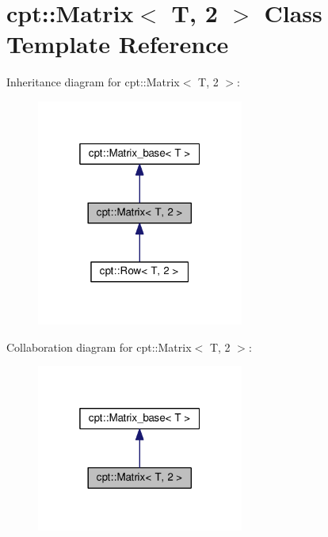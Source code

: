 \hypertarget{classcpt_1_1Matrix_3_01T_00_012_01_4}{}\section{cpt\+:\+:Matrix$<$ T, 2 $>$ Class Template Reference}
\label{classcpt_1_1Matrix_3_01T_00_012_01_4}


Inheritance diagram for cpt\+:\+:Matrix$<$ T, 2 $>$\+:
\nopagebreak
\begin{figure}[H]
\begin{center}
\leavevmode
\includegraphics[width=193pt]{classcpt_1_1Matrix_3_01T_00_012_01_4__inherit__graph}
\end{center}
\end{figure}


Collaboration diagram for cpt\+:\+:Matrix$<$ T, 2 $>$\+:
\nopagebreak
\begin{figure}[H]
\begin{center}
\leavevmode
\includegraphics[width=193pt]{classcpt_1_1Matrix_3_01T_00_012_01_4__coll__graph}
\end{center}
\end{figure}
